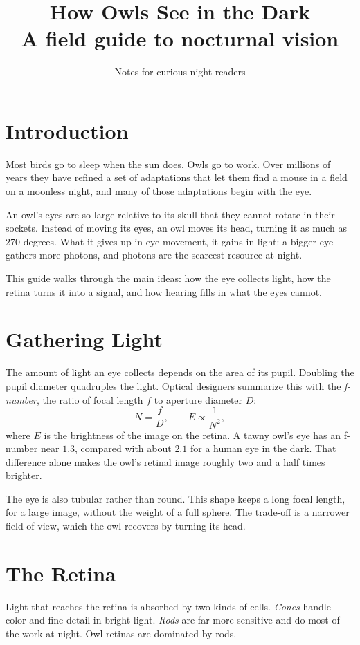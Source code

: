 \documentclass[11pt]{article}
\title{\textbf{How Owls See in the Dark}\\[0.3em]\large A field guide to nocturnal vision}
\author{Notes for curious night readers}
\date{}
\begin{document}
\maketitle
\vspace{-1.5em}
\tableofcontents

\section{Introduction}
Most birds go to sleep when the sun does. Owls go to work. Over millions of
years they have refined a set of adaptations that let them find a mouse in a
field on a moonless night, and many of those adaptations begin with the eye.

An owl's eyes are so large relative to its skull that they cannot rotate in
their sockets. Instead of moving its eyes, an owl moves its head, turning it
as much as 270 degrees. What it gives up in eye movement, it gains in light:
a bigger eye gathers more photons, and photons are the scarcest resource at
night.

This guide walks through the main ideas: how the eye collects light, how the
retina turns it into a signal, and how hearing fills in what the eyes cannot.

\section{Gathering Light}
The amount of light an eye collects depends on the area of its pupil. Doubling
the pupil diameter quadruples the light. Optical designers summarize this with
the \emph{f-number}, the ratio of focal length $f$ to aperture diameter $D$:
\begin{equation}
  N = \frac{f}{D}, \qquad E \propto \frac{1}{N^{2}},
\end{equation}
where $E$ is the brightness of the image on the retina. A tawny owl's eye has an
f-number near $1.3$, compared with about $2.1$ for a human eye in the dark.
That difference alone makes the owl's retinal image roughly two and a half
times brighter.

The eye is also tubular rather than round. This shape keeps a long focal length,
for a large image, without the weight of a full sphere. The trade-off is a
narrower field of view, which the owl recovers by turning its head.

\section{The Retina}
Light that reaches the retina is absorbed by two kinds of cells. \emph{Cones}
handle color and fine detail in bright light. \emph{Rods} are far more sensitive
and do most of the work at night. Owl retinas are dominated by rods.
\end{document}

